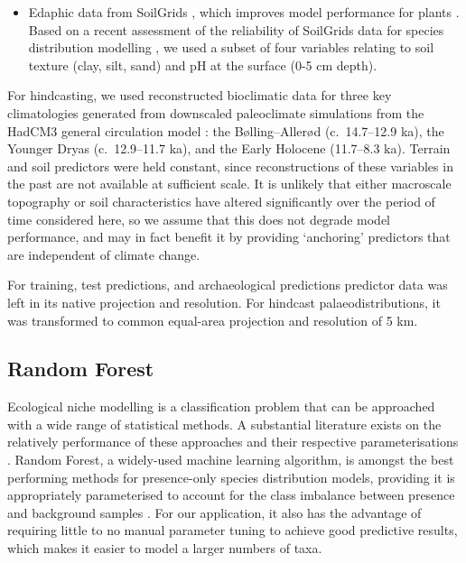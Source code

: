 \documentclass[
  authoryear,
  preprint]{elsarticle}
\providecommand{\tightlist}{%
  \setlength{\itemsep}{0pt}\setlength{\parskip}{0pt}}\usepackage{longtable,booktabs,array}
\begin{document}
\begin{itemize}
\tightlist
\item
  Edaphic data from SoilGrids \citep{HenglEtAl2014, HenglEtAl2017},
  which improves model performance for plants
  \citep{DubuisEtAl2013, ModEtAl2016, VelazcoEtAl2017}. Based on a
  recent assessment of the reliability of SoilGrids data for species
  distribution modelling \citep{MillerEtAl2024}, we used a subset of
  four variables relating to soil texture (clay, silt, sand) and pH at
  the surface (0-5 cm depth).
\end{itemize}

For hindcasting, we used reconstructed bioclimatic data for three key
climatologies generated from downscaled paleoclimate simulations from
the HadCM3 general circulation model
\citep{FordhamEtAl2017, BrownEtAl2018}: the Bølling--Allerød
(c.~14.7--12.9 ka), the Younger Dryas (c.~12.9--11.7 ka), and the Early
Holocene (11.7--8.3 ka). Terrain and soil predictors were held constant,
since reconstructions of these variables in the past are not available
at sufficient scale. It is unlikely that either macroscale topography or
soil characteristics have altered significantly over the period of time
considered here, so we assume that this does not degrade model
performance, and may in fact benefit it by providing `anchoring'
predictors that are independent of climate change.

For training, test predictions, and archaeological predictions predictor
data was left in its native projection and resolution. For hindcast
palaeodistributions, it was transformed to common equal-area projection
and resolution of 5 km.

\subsection{Random Forest}\label{random-forest}

Ecological niche modelling is a classification problem that can be
approached with a wide range of statistical methods. A substantial
literature exists on the relatively performance of these approaches and
their respective parameterisations \citep[reviewed
in][]{ValaviEtAl2022}. Random Forest, a widely-used machine learning
algorithm, is amongst the best performing methods for presence-only
species distribution models, providing it is appropriately parameterised
to account for the class imbalance between presence and background
samples \citep{ValaviEtAl2021, ValaviEtAl2022}. For our application, it
also has the advantage of requiring little to no manual parameter tuning
to achieve good predictive results, which makes it easier to model a
larger numbers of taxa.
\end{document}
